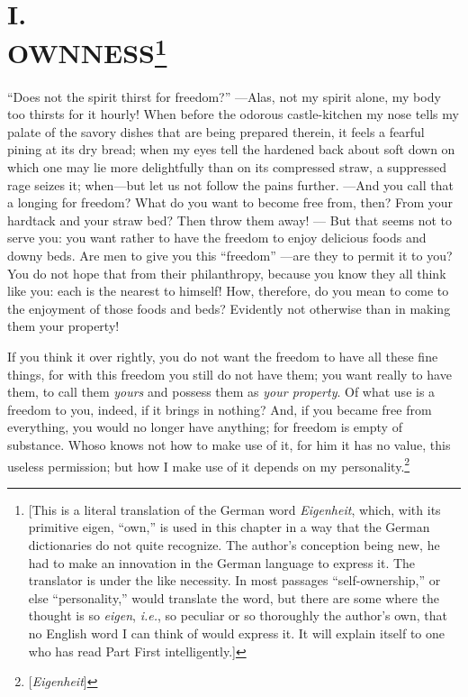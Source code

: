 
\chapter[I. Ownness]{\centering I.\\
OWNNESS\footnote{[This is a literal translation of the German word 
\textit{Eigenheit}, which, with its primitive eigen, ``own,'' is used in 
this chapter in a way that the German dictionaries do not quite recognize. The 
author's conception being new, he had to make an innovation in the German 
language to express it. The translator is under the like necessity. In most 
passages ``self-ownership,'' or else ``personality,'' would translate the 
word, but there are some where the thought is so \textit{eigen}, \textit{i.e.},
so peculiar or so thoroughly the author's own, that no English word I can 
think of would express it. It will explain itself to one who has read Part 
First intelligently.]}}

``Does not the spirit thirst for freedom?'' ---Alas, not my spirit alone, my 
body too thirsts for it hourly! When before the odorous castle-kitchen my nose 
tells my palate of the savory dishes that are being prepared therein, it feels 
a fearful pining at its dry bread; when my eyes tell the hardened back about 
soft down on which one may lie more delightfully than on its compressed straw, 
a suppressed rage seizes it; when---but let us not follow the pains further. ---And you call that a longing for freedom? What do you want to become free 
from, then? From your hardtack and your straw bed? Then throw them away! --- 
But that seems not to serve you: you want rather to have the freedom to enjoy 
delicious foods and downy beds. Are men to give you this ``freedom'' ---are 
they to permit it to you? You do not hope that from their philanthropy, 
because you know they all think like you: each is the nearest to himself! How, 
therefore, do you mean to come to the enjoyment of those foods and beds? 
Evidently not otherwise than in making them your property!

If you think it over rightly, you do not want the freedom to have all these 
fine things, for with this freedom you still do not have them; you want really 
to have them, to call them \textit{yours} and possess them as \textit{your 
property}. Of what use is a freedom to you, indeed, if it brings in nothing? 
And, if you became free from everything, you would no longer have anything; 
for freedom is empty of substance. Whoso knows not how to make use of it, for 
him it has no value, this useless permission; but how I make use of it depends 
on my personality.\footnote{[\textit{Eigenheit}]}

